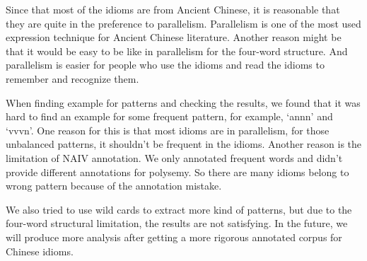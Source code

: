 Since that most of the idioms are from Ancient Chinese, it is reasonable that they are quite in the preference to parallelism. Parallelism is one of the most used expression technique for Ancient Chinese literature. Another reason might be that it would be easy to be like in parallelism for the four-word structure. And parallelism is easier for people who use the idioms and read the idioms to remember and recognize them. 

When finding example for patterns and checking the results, we found that it was hard to find an example for some frequent pattern, for example, `annn' and `vvvn'. One reason for this is that most idioms are in parallelism, for those unbalanced patterns, it shouldn't be frequent in the idioms. Another reason is the limitation of NAIV annotation. We only annotated frequent words and didn't provide different annotations for polysemy. So there are many idioms belong to wrong pattern because of the annotation mistake. 

We also tried to use wild cards to extract more kind of patterns, but due to the four-word structural limitation, the results are not satisfying. In the future, we will produce more analysis after getting a more rigorous annotated corpus for Chinese idioms. 